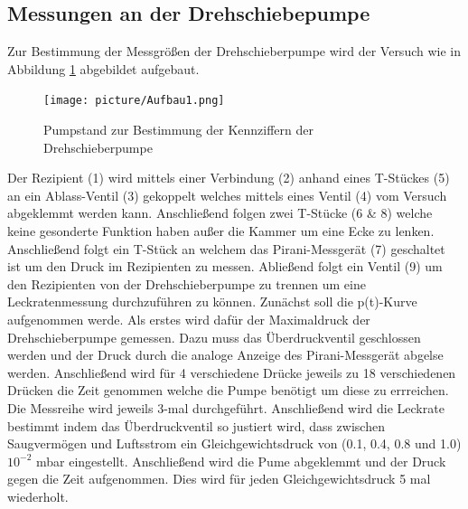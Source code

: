 \subsection{Messungen an der Drehschiebepumpe}
Zur Bestimmung der Messgrößen der Drehschieberpumpe wird der Versuch wie in Abbildung \ref{fig:Dreh} abgebildet aufgebaut. 
\begin{figure}[htpb]
  \centering
  \texttt{[image: picture/Aufbau1.png]}
  \caption{Pumpstand zur Bestimmung der Kennziffern der Drehschieberpumpe}
  \label{fig:Dreh}
\end{figure}
Der Rezipient (1) wird mittels einer Verbindung (2) anhand eines T-Stückes (5) an ein Ablass-Ventil (3) gekoppelt welches mittels eines Ventil (4) vom Versuch abgeklemmt werden kann. Anschließend folgen zwei T-Stücke (6 \& 8) welche keine gesonderte Funktion haben außer die Kammer um eine Ecke zu lenken. Anschließend folgt ein T-Stück an welchem das Pirani-Messgerät (7) geschaltet ist um den Druck im Rezipienten zu messen. Abließend folgt ein Ventil (9) um den Rezipienten von der Drehschieberpumpe zu trennen um eine Leckratenmessung durchzuführen zu können. \newline
Zunächst soll die p(t)-Kurve aufgenommen werde. Als erstes wird dafür der Maximaldruck der Drehschieberpumpe gemessen. Dazu muss das Überdruckventil geschlossen werden und der Druck durch die analoge Anzeige des Pirani-Messgerät abgelse werden. Anschließend wird für 4 verschiedene Drücke jeweils zu 18 verschiedenen Drücken die Zeit genommen welche die Pumpe benötigt um diese zu errreichen. Die Messreihe wird jeweils 3-mal durchgeführt. \newline 
Anschließend wird die Leckrate bestimmt indem das Überdruckventil so justiert wird, dass zwischen Saugvermögen und Luftsstrom ein Gleichgewichtsdruck von (0.1, 0.4, 0.8 und 1.0) \cdot $10^{-2}$ mbar eingestellt. Anschließend wird die Pume abgeklemmt und der Druck gegen die Zeit aufgenommen. Dies wird für jeden Gleichgewichtsdruck 5 mal wiederholt.  \newline

